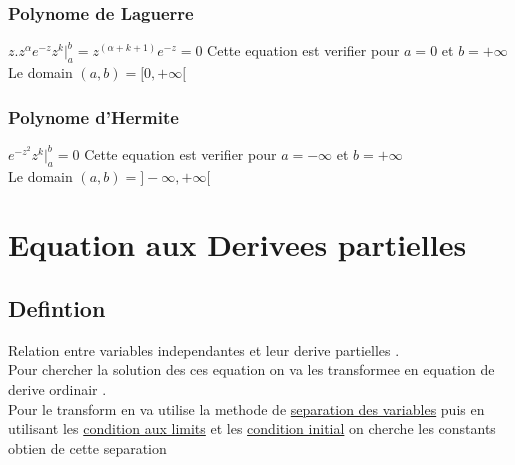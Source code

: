\documentclass[12pt]{book}
\begin{document}
            \subsection*{Polynome de Laguerre}
                $z.z^\alpha e^{-z}z^k|_a^b =z^(\alpha + k +1)e^{-z}=0$ Cette equation est verifier pour $a=0 $ et $ b=+\infty $ \\
                Le domain $(a,b) = [0,+\infty[$
            \subsection*{Polynome d'Hermite}
                $e^{-z^2}z^k|_a^b =0$ Cette equation est verifier pour $a=-\infty $ et $ b=+\infty $ \\
                Le domain $(a,b) = ]-\infty , +\infty[$
    \chapter{Equation aux Derivees partielles}
        \section{Defintion}
            Relation entre variables independantes et leur derive partielles . \\
            Pour chercher la solution des ces equation on va les transformee en equation de derive ordinair .\\
            Pour le transform en va utilise la methode de \underline{separation des variables} puis en utilisant les \underline{condition aux limits} et les \underline{condition initial} on cherche les constants obtien de cette separation \\
\end{document}
